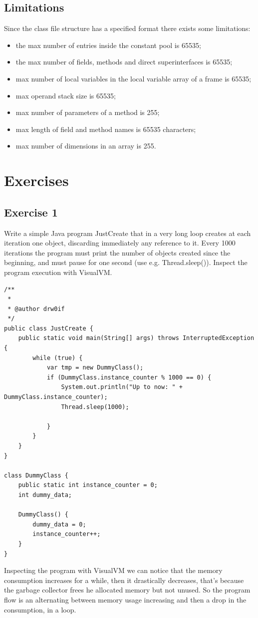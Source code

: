 \subsection{Limitations}
Since the class file structure has a specified format there exists some limitations:
\begin{itemize}
    \item the max number of entries inside the constant pool is 65535;
    \item the max number of fields, methods and direct superinterfaces is 65535;
    \item max number of local variables in the local variable array of a frame is 65535;
    \item max operand stack size is 65535;
    \item max number of parameters of a method is 255;
    \item max length of field and method names is 65535 characters;
    \item max number of dimensions in an array is 255.
\end{itemize}

\section{Exercises}
\subsection{Exercise 1}
Write a simple Java program JustCreate that in a very long loop creates at each iteration one object, discarding immediately any reference to it.
Every 1000 iterations the program must print the number of objects created since the beginning, and must pause for one second (use e.g. Thread.sleep()).
Inspect the program execution with VisualVM.

\begin{verbatim}
/**
 *
 * @author drw0if
 */
public class JustCreate {
    public static void main(String[] args) throws InterruptedException {
        while (true) {
            var tmp = new DummyClass();
            if (DummyClass.instance_counter % 1000 == 0) {
                System.out.println("Up to now: " + DummyClass.instance_counter);
                Thread.sleep(1000);

            }
        }
    }
}

class DummyClass {
    public static int instance_counter = 0;
    int dummy_data;

    DummyClass() {
        dummy_data = 0;
        instance_counter++;
    }
}
\end{verbatim}
Inspecting the program with VisualVM we can notice that the memory consumption increases for a while, then it drastically decreases, that's because the garbage collector frees he allocated memory but not unused.
So the program flow is an alternating between memory usage increasing and then a drop in the consumption, in a loop.

